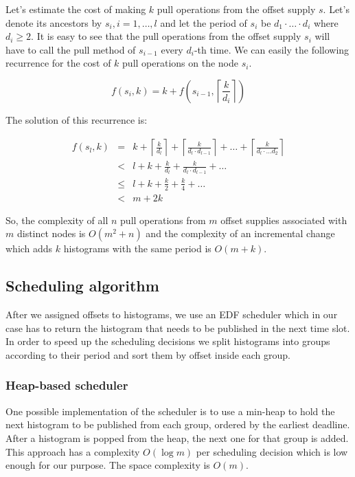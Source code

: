 Let's estimate the cost of making $k$ pull operations from the offset supply $s$. Let's denote its ancestors by $s_i,i=1,\ldots,l$ and let the period of $s_i$ be $d_1\cdot\ldots\cdot d_i$ where $d_i \geq 2$. It is easy to see that the pull operations from the offset supply $s_i$ will have to call the pull method of $s_{i-1}$ every $d_i$-th time. We can easily the following recurrence for the cost of $k$ pull operations on the node $s_i$.

$$ f(s_i, k) = k + f\left(s_{i-1}, \left\lceil \frac k {d_i} \right\rceil \right)$$

The solution of this recurrence is:

\begin{eqnarray*}
f(s_l,k) &=& k+ \left\lceil \frac k {d_l} \right\rceil + \left\lceil \frac k {d_l\cdot d_{l-1}} \right\rceil + \ldots + \left\lceil \frac k {d_l\cdot \ldots d_2}\right\rceil \\
         &<&l+k+\frac k {d_l}+ \frac k {d_l\cdot d_{l-1}} + \ldots \\
         &\leq & l+k+\frac k 2+\frac k 4 + \ldots \\
         &<& m+2k
\end{eqnarray*}

So, the complexity of all $n$ pull operations from $m$ offset supplies associated with $m$ distinct nodes is $O(m^2+n)$ and the complexity of an incremental change which adds $k$ histograms with the same period is $O(m+k)$. 

\subsection{Scheduling algorithm}

After we assigned offsets to histograms, we use an EDF scheduler which in our case has to return the histogram that needs to be published in the next time slot. In order to speed up the scheduling decisions we split histograms into groups according to their period and sort them by offset inside each group. 

\subsubsection*{Heap-based scheduler}

One possible implementation of the scheduler is to use a min-heap to hold the next histogram to be published from each group, ordered by the earliest deadline. After a histogram is popped from the heap, the next one for that group is added. This approach has a complexity $O(\log m)$ per scheduling decision which is low enough for our purpose. The space complexity is $O(m)$.

